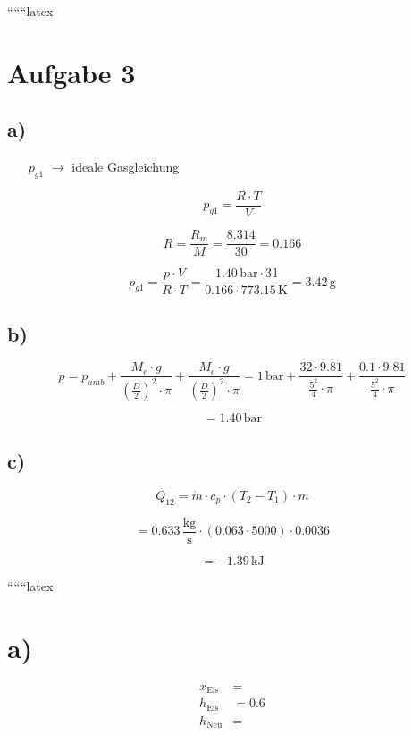 
``````latex


\section*{Aufgabe 3}

\subsection*{a)}
\begin{itemize}
    \item[$p_{g1}$] $\rightarrow$ ideale Gasgleichung
\end{itemize}

\[
p_{g1} = \frac{R \cdot T}{V}
\]

\[
R = \frac{R_m}{M} = \frac{8.314}{30} = 0.166
\]

\[
p_{g1} = \frac{p \cdot V}{R \cdot T} = \frac{1.40 \, \text{bar} \cdot 3 \, \text{l}}{0.166 \cdot 773.15 \, \text{K}} = 3.42 \, \text{g}
\]

\subsection*{b)}
\[
p = p_{amb} + \frac{M_e \cdot g}{\left(\frac{D}{2}\right)^2 \cdot \pi} + \frac{M_e \cdot g}{\left(\frac{D}{2}\right)^2 \cdot \pi} = 1 \, \text{bar} + \frac{32 \cdot 9.81}{\frac{5^2}{4} \cdot \pi} + \frac{0.1 \cdot 9.81}{\frac{5^2}{4} \cdot \pi}
\]

\[
= 1.40 \, \text{bar}
\]

\subsection*{c)}
\[
Q_{12} = \dot{m} \cdot c_p \cdot (T_2 - T_1) \cdot m
\]

\[
= 0.633 \, \frac{\text{kg}}{\text{s}} \cdot (0.063 \cdot 5000) \cdot 0.0036
\]

\[
= -1.39 \, \text{kJ}
\]

``````latex


\section*{a)}

\begin{align*}
x_{\text{Eis}} &= \\
h_{\text{Eis}} &= 0.6 \\
h_{\text{Neu}} &= 
\end{align*}

